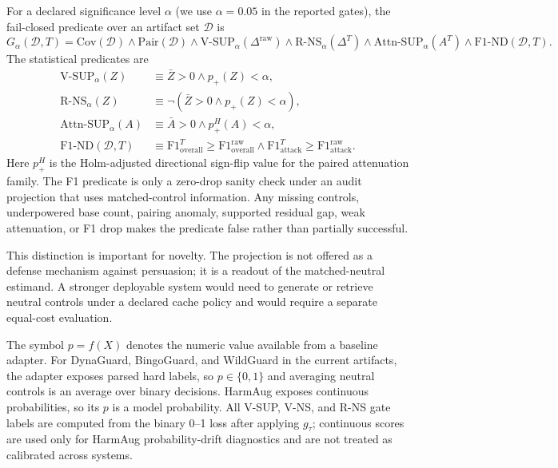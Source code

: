For a declared significance level $\alpha$ (we use $\alpha=0.05$ in the reported gates), the fail-closed predicate over an artifact set $\mathcal{D}$ is
\[
    G_{\alpha}(\mathcal{D},T)=
    \mathrm{Cov}(\mathcal{D})
    \wedge
    \mathrm{Pair}(\mathcal{D})
    \wedge
    \mathrm{V\mbox{-}SUP}_{\alpha}(\Delta^{\mathrm{raw}})
    \wedge
    \mathrm{R\mbox{-}NS}_{\alpha}(\Delta^{T})
    \wedge
    \mathrm{Attn\mbox{-}SUP}_{\alpha}(A^{T})
    \wedge
    \mathrm{F1\mbox{-}ND}(\mathcal{D},T).
\]
The statistical predicates are
\[
\begin{aligned}
    \mathrm{V\mbox{-}SUP}_{\alpha}(Z)
        &\equiv \bar{Z}>0 \wedge p_+(Z)<\alpha,\\
    \mathrm{R\mbox{-}NS}_{\alpha}(Z)
        &\equiv \neg\left(\bar{Z}>0 \wedge p_+(Z)<\alpha\right),\\
    \mathrm{Attn\mbox{-}SUP}_{\alpha}(A)
        &\equiv \bar{A}>0 \wedge p^{H}_+(A)<\alpha,\\
    \mathrm{F1\mbox{-}ND}(\mathcal{D},T)
        &\equiv \mathrm{F1}^{T}_{\mathrm{overall}}\ge \mathrm{F1}^{\mathrm{raw}}_{\mathrm{overall}}
        \wedge
        \mathrm{F1}^{T}_{\mathrm{attack}}\ge \mathrm{F1}^{\mathrm{raw}}_{\mathrm{attack}}.
\end{aligned}
\]
Here $p^{H}_+$ is the Holm-adjusted directional sign-flip value for the paired attenuation family. The F1 predicate is only a zero-drop sanity check under an audit projection that uses matched-control information.
Any missing controls, underpowered base count, pairing anomaly, supported residual gap, weak attenuation, or F1 drop makes the predicate false rather than partially successful.

This distinction is important for novelty. The projection is not offered as a defense mechanism against persuasion; it is a readout of the matched-neutral estimand. A stronger deployable system would need to generate or retrieve neutral controls under a declared cache policy and would require a separate equal-cost evaluation.

The symbol $p=f(X)$ denotes the numeric value available from a baseline adapter. For DynaGuard, BingoGuard, and WildGuard in the current artifacts, the adapter exposes parsed hard labels, so $p\in\{0,1\}$ and averaging neutral controls is an average over binary decisions. HarmAug exposes continuous probabilities, so its $p$ is a model probability. All V-SUP, V-NS, and R-NS gate labels are computed from the binary 0--1 loss after applying $g_\tau$; continuous scores are used only for HarmAug probability-drift diagnostics and are not treated as calibrated across systems.

